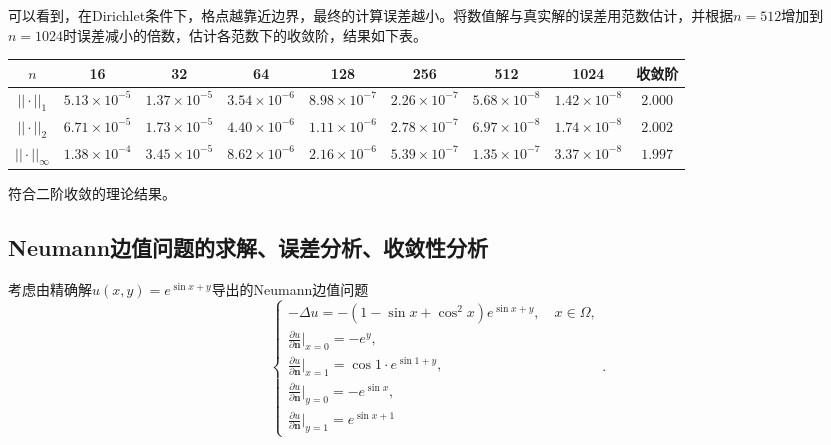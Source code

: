 \documentclass[lang=cn,10pt]{elegantbook}
\begin{document}
可以看到，在Dirichlet条件下，格点越靠近边界，最终的计算误差越小。将数值解与真实解的误差用范数估计，并根据$n=512$增加到$n=1024$时误差减小的倍数，估计各范数下的收敛阶，结果如下表。

\begin{table}[H]
  \centering
  \small
  \begin{tabular}{c|ccccccc|c}
  \textbf{$n$}        & 16                   & 32                   & 64                   & 128                  & 256                  & 512                  & 1024                  & 收敛阶 \\ \hline
  $||\cdot||_1$      & $5.13\times 10^{-5}$ & $1.37\times 10^{-5}$ & $3.54\times 10^{-6}$ & $8.98\times 10^{-7}$ & $2.26\times 10^{-7}$ & $5.68\times 10^{-8}$ & $1.42\times 10^{-8}$ & $2.000$\\
  $||\cdot||_2$      & $6.71\times 10^{-5}$ & $1.73\times 10^{-5}$ & $4.40\times 10^{-6}$ & $1.11\times 10^{-6}$ & $2.78\times 10^{-7}$ & $6.97\times 10^{-8}$ & $1.74\times 10^{-8}$ & $2.002$\\
  $||\cdot||_\infty$ & $1.38\times 10^{-4}$ & $3.45\times 10^{-5}$ & $8.62\times 10^{-6}$ & $2.16\times 10^{-6}$ & $5.39\times 10^{-7}$ & $1.35\times 10^{-7}$ & $3.37\times 10^{-8}$ & $1.997$
  \end{tabular}
\end{table}

符合二阶收敛的理论结果。

\subsection{Neumann边值问题的求解、误差分析、收敛性分析}

考虑由精确解$u(x,y)=e^{\sin x+y}$导出的Neumann边值问题
\begin{equation}
  \left\{
    \begin{array}{l}
      -\Delta u = -(1-\sin x+\cos^2 x)e^{\sin x + y},\quad x\in\Omega, \\
      \frac{\partial u}{\partial \mathbf{n}}|_{x=0}=-e^{y},\\
      \frac{\partial u}{\partial \mathbf{n}}|_{x=1}=\cos 1 \cdot e^{\sin 1 + y},\\
      \frac{\partial u}{\partial \mathbf{n}}|_{y=0}=-e^{\sin x},\\
      \frac{\partial u}{\partial \mathbf{n}}|_{y=1}=e^{\sin x+1}
    \end{array}
  \right. .
\end{equation}
\end{document}
